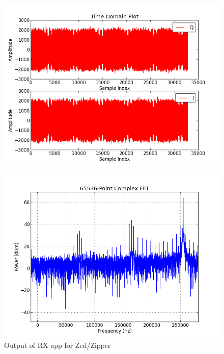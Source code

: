 \pagebreak
        \begin{figure}[h]
                \centering
                \includegraphics[scale=.5]{rx_app_sig_gen_time_domain_zed_zipper}
                \label{fig:rx_app_sig_gen_time_domain_zed_zipper}
        \end{figure}
        \begin{figure}[h]
                \centering
                \includegraphics[scale=.5]{rx_app_sig_gen_fft_zed_zipper}
                \caption{Output of RX app for Zed/Zipper}
                \label{fig:rx_app_sig_gen_fft_zed_zipper}
        \end{figure}
